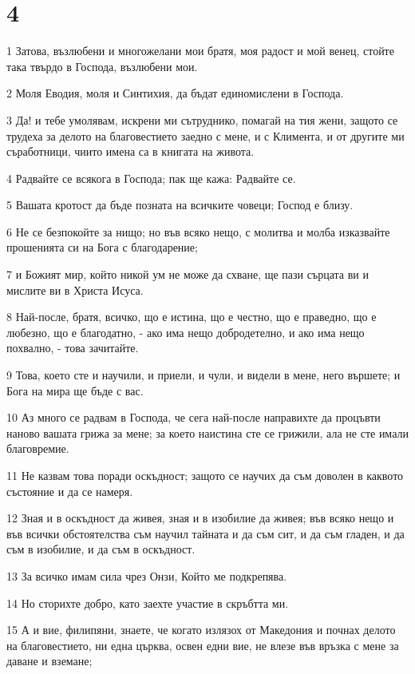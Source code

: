\chapter{4}

\par 1 Затова, възлюбени и многожелани мои братя, моя радост и мой венец, стойте така твърдо в Господа, възлюбени мои.
\par 2 Моля Еводия, моля и Синтихия, да бъдат единомислени в Господа.
\par 3 Да! и тебе умолявам, искрени ми сътруднико, помагай на тия жени, защото се трудеха за делото на благовестието заедно с мене, и с Климента, и от другите ми съработници, чиито имена са в книгата на живота.
\par 4 Радвайте се всякога в Господа; пак ще кажа: Радвайте се.
\par 5 Вашата кротост да бъде позната на всичките човеци; Господ е близу.
\par 6 Не се безпокойте за нищо; но във всяко нещо, с молитва и молба изказвайте прошенията си на Бога с благодарение;
\par 7 и Божият мир, който никой ум не може да схване, ще пази сърцата ви и мислите ви в Христа Исуса.
\par 8 Най-после, братя, всичко, що е истина, що е честно, що е праведно, що е любезно, що е благодатно, - ако има нещо добродетелно, и ако има нещо похвално, - това зачитайте.
\par 9 Това, което сте и научили, и приели, и чули, и видели в мене, него вършете; и Бога на мира ще бъде с вас.
\par 10 Аз много се радвам в Господа, че сега най-после направихте да процъвти наново вашата грижа за мене; за което наистина сте се грижили, ала не сте имали благовремие.
\par 11 Не казвам това поради оскъдност; защото се научих да съм доволен в каквото състояние и да се намеря.
\par 12 Зная и в оскъдност да живея, зная и в изобилие да живея; във всяко нещо и във всички обстоятелства съм научил тайната и да съм сит, и да съм гладен, и да съм в изобилие, и да съм в оскъдност.
\par 13 За всичко имам сила чрез Онзи, Който ме подкрепява.
\par 14 Но сторихте добро, като заехте участие в скръбтта ми.
\par 15 А и вие, филипяни, знаете, че когато излязох от Македония и почнах делото на благовестието, ни една църква, освен едни вие, не влезе във връзка с мене за даване и вземане;
